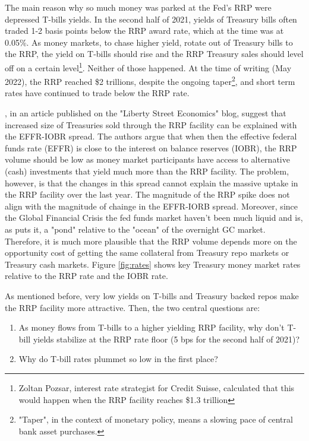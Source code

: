 \documentclass[11pt,a4paper,english,oneside]{article}
\begin{document}
The main reason why so much money was parked at the Fed's RRP were depressed T-bills yields. In the second half of 2021, yields of Treasury bills often traded 1-2 basis points below the RRP award rate, which at the time was at 0.05\%. As money markets, to chase higher yield, rotate out of Treasury bills to the RRP, the yield on T-bills should rise and the RRP Treasury sales should level off on a certain level\footnote{Zoltan Pozsar, interest rate strategist for Credit Suisse, calculated that this would happen when the RRP facility reaches \$1.3 trillion}. Neither of those happened. At the time of writing (May 2022), the RRP reached \$2 trillions, despite the ongoing taper\footnote{"Taper", in the context of monetary policy, means a slowing pace of central bank asset purchases.}, and short term rates have continued to trade below the RRP rate.

\citet{alfonso2022}, in an article published on the "Liberty Street Economics" blog, suggest that increased size of Treasuries sold through the RRP facility can be explained with the EFFR-IOBR spread. The authors argue that when then the effective federal funds rate (EFFR) is close to the interest on balance reserves (IOBR), the RRP volume should be low as money market participants have access to alternative (cash) investments that yield much more than the RRP facility. The problem, however, is that the changes in this spread cannot explain the massive uptake in the RRP facility over the last year. The magnitude of the RRP spike does not align with the magnitude of chainge in the EFFR-IORB spread. Moreover, since the Global Financial Crisis the fed funds market haven't been much liquid and is, as \citet{gmn22} puts it, a "pond" relative to the "ocean" of the overnight GC market. Therefore, it is much more plausible that the RRP volume depends more on the opportunity cost of getting the same collateral from Treasury repo markets or Treasury cash markets. Figure \ref{fig:rates} shows key Treasury money market rates relative to the RRP rate and the IOBR rate.

As mentioned before, very low yields on T-bills and Treasury backed repos make the RRP facility more attractive. Then, the two central questions are:
\begin{enumerate}
  \item As money flows from T-bills to a higher yielding RRP facility, why don't T-bill yields stabilize at the RRP rate floor (5 bps for the second half of 2021)?
  \item Why do T-bill rates plummet so low in the first place?
\end{enumerate}
\end{document}
